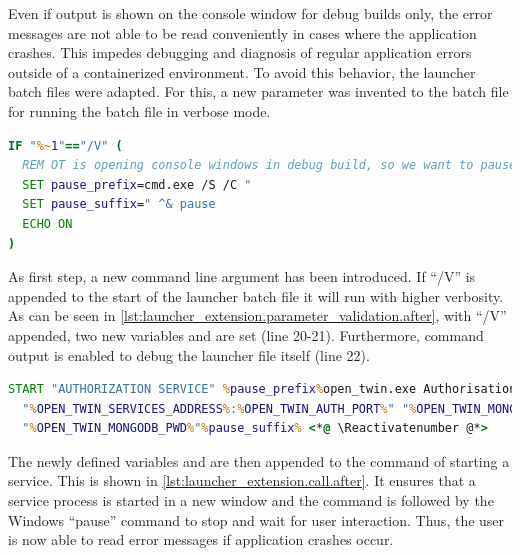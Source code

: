 Even if output is shown on the console window for debug builds only, the error messages are not able to be read conveniently in cases where the application crashes. This impedes debugging and diagnosis of regular application errors outside of a containerized environment.
To avoid this behavior, the launcher batch files were adapted. For this, a new parameter was invented to the batch file for running the batch file in verbose mode.
\begin{lstlisting}[label=lst:launcher_extension.parameter_validation.after, caption={Additional command argument for preventing close of window after termination (\textit{/Microservices/Launcher/OpenTwin\_session.bat})}, language=cmd, firstnumber=18]
IF "%~1"=="/V" (
  REM OT is opening console windows in debug build, so we want to pause them at the end
  SET pause_prefix=cmd.exe /S /C "
  SET pause_suffix=" ^& pause
  ECHO ON
)
\end{lstlisting}
As first step, a new command line argument has been introduced. If \enquote{/V} is appended to the start of the launcher batch file it will run with higher verbosity.  As can be seen in \autoref{lst:launcher_extension.parameter_validation.after}, with \enquote{/V} appended, two new variables  and  are set (line 20-21). Furthermore, command output is enabled to debug the launcher file itself (line 22).

\begin{lstlisting}[label=lst:launcher_extension.call.after, caption={Additional command extension for preventing close of window after termination (\textit{/Microservices/Launcher/OpenTwin\_session.bat})}, language=cmd, firstnumber=34]
START "AUTHORIZATION SERVICE" %pause_prefix%open_twin.exe AuthorisationService.dll <*@ \Suppressnumber @*>
  "%OPEN_TWIN_SERVICES_ADDRESS%:%OPEN_TWIN_AUTH_PORT%" "%OPEN_TWIN_MONGODB_ADDRESS%"
  "%OPEN_TWIN_MONGODB_PWD%"%pause_suffix% <*@ \Reactivatenumber @*>
\end{lstlisting}
The newly defined variables  and  are then appended to the command of starting a service. This is shown in \autoref{lst:launcher_extension.call.after}. It ensures that a service process is started in a new window and the command is followed by the \ac{Windows} \enquote{pause} command to stop and wait for user interaction. Thus, the user is now able to read error messages if application crashes occur.

